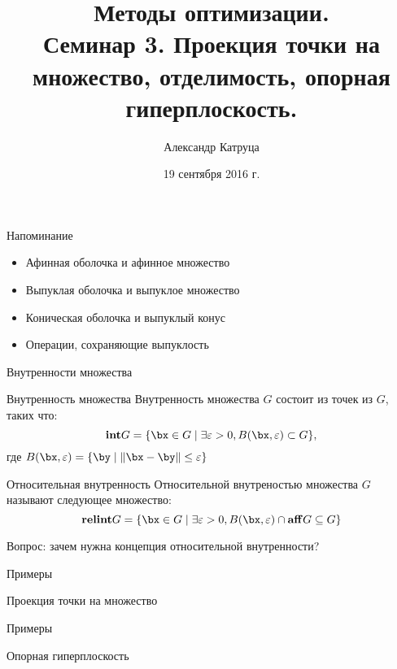 \documentclass[12pt,russian]{beamer}
\title[Семинар 3]{Методы оптимизации. \\
 Семинар 3. Проекция точки на множество, отделимость, опорная гиперплоскость.}
\author{Александр Катруца}
\institute{Московский физико-технический институт,\\
Факультет Управления и Прикладной Математики}
\date{19 сентября 2016 г.}
\newcommand{\relint}{\mathbf{relint}}
\newcommand{\inter}{\mathbf{int}}
\begin{document}
\begin{frame}
\maketitle
\end{frame}

\begin{frame}{Напоминание}
\begin{itemize}
\item Афинная оболочка и афинное множество
\item Выпуклая оболочка и выпуклое множество
\item Коническая оболочка и выпуклый конус
\item Операции, сохраняющие выпуклость
\end{itemize}
\end{frame}

\begin{frame}{Внутренности множества}

\begin{block}{Внутренность множества}
Внутренность множества $G$ состоит из точек из $G$, таких что:
\[ 
\inter G = \{ \bx \in G \; | \; \exists \varepsilon > 0, B(\bx, \varepsilon) \subset G\},
\]
где $B(\bx, \varepsilon) = \{ \by \; | \; \| \bx - \by \| \leq \varepsilon \}$
\end{block}

\begin{block}{Относительная внутренность}
Относительной внутреностью множества $G$ называют следующее множество: 
\[
\relint G = \{ \bx \in G \; | \; \exists \varepsilon > 0,  B(\bx, \varepsilon) \cap \mathbf{aff} G \subseteq G \}
\]
\end{block}
Вопрос: зачем нужна концепция относительной внутренности?
\end{frame}

\begin{frame}{Примеры}

\end{frame}

\begin{frame}{Проекция точки на множество}

\end{frame}

\begin{frame}{Примеры}

\end{frame}

\begin{frame}{Опорная гиперплоскость}

\end{frame}
\end{document}
